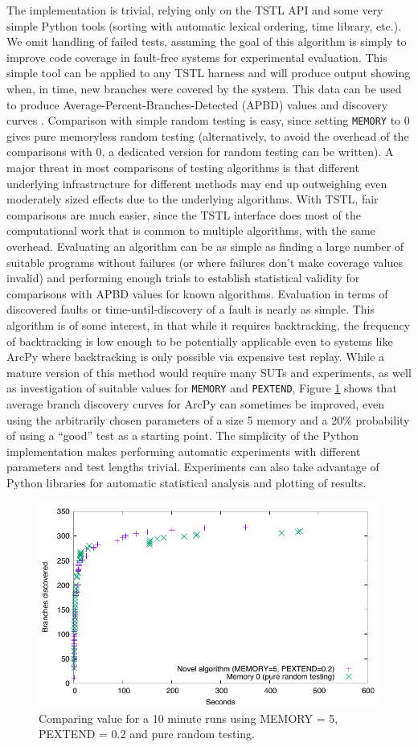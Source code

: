 The implementation is trivial, relying only on the TSTL API and some very simple Python tools (sorting with automatic lexical ordering, time library, etc.).  We omit handling of failed tests, assuming the goal of this algorithm is simply to improve code coverage in fault-free systems for experimental evaluation.  This simple tool can be applied to any TSTL harness and will produce output showing when, in time, new branches were covered by the system.  This data can be used to produce Average-Percent-Branches-Detected (APBD) values and discovery curves \cite{issta14}. Comparison with simple random testing is easy, since setting {\tt MEMORY} to 0 gives pure memoryless random testing (alternatively, to avoid the overhead of the comparisons with 0, a dedicated version for random testing can be written).  A major threat in most comparisons of testing algorithms is that different underlying infrastructure for different methods may end up outweighing even moderately sized effects due to the underlying algorithms.  With TSTL, fair comparisons are much easier, since the TSTL interface does most of the computational work that is common to multiple algorithms, with the same overhead.  Evaluating an algorithm can be as simple as finding a large number of suitable programs without failures (or where failures don't make coverage values invalid) and performing enough trials to establish statistical validity for comparisons with APBD values for known algorithms.  Evaluation in terms of discovered faults or time-until-discovery of a fault is nearly as simple.  This algorithm is of some interest, in that while it requires backtracking, the frequency of backtracking is low enough to be potentially applicable even to systems like ArcPy where backtracking is only possible via expensive test replay.  While a mature version of this method would require many SUTs and experiments, as well as investigation of suitable values for {\tt MEMORY} and {\tt PEXTEND}, Figure \ref{fig:compare} shows that average branch discovery curves for ArcPy can sometimes be improved, even using the  arbitrarily chosen parameters of a size 5 memory and a 20\% probability of using a ``good'' test as a starting point.  The simplicity of the Python implementation makes performing automatic experiments with different parameters and test lengths trivial.  Experiments can also take advantage of Python libraries for automatic statistical analysis and plotting of results.

\begin{figure}
\includegraphics[width=\columnwidth]{memory}
\caption{Comparing value for a 10 minute runs using MEMORY = 5, PEXTEND = 0.2 and pure random testing.}
\label{fig:compare}
\end{figure}